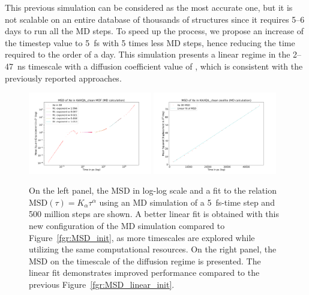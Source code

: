 \documentclass[main]{subfiles}
\begin{document}
This previous simulation can be considered as the most accurate one, but it is not scalable on an entire database of thousands of structures since it requires 5--6 days to run all the MD steps. To speed up the process, we propose an increase of the timestep value to 5~\si{\fs} with 5 times less MD steps, hence reducing the time required to the order of a day. This simulation presents a linear regime in the {2}--{47}~\si{\ns} timescale with a diffusion coefficient value of , which is consistent with the previously reported approaches. 

\begin{figure}[ht]
  \centering
  \includegraphics[width=0.48\textwidth]{figures/5-diffusion/MSD_Xe_KAXQIL_clean_5fs.pdf}
  \includegraphics[width=0.48\textwidth]{figures/5-diffusion/MSD_Xe_coeff_KAXQIL_clean_5fs.pdf}
\caption{ On the left panel, the MSD in log-log scale and a fit to the relation $\text{MSD}(\tau) = K_\alpha\tau^\alpha$ using an MD simulation of a \SI{5}{\fs}-time step and 500 million steps are shown. A better linear fit is obtained with this new configuration of the MD simulation compared to Figure~\ref{fgr:MSD_init}, as more timescales are explored while utilizing the same computational resources. On the right panel, the MSD on the timescale of the diffusion regime is presented. The linear fit demonstrates improved performance compared to the previous Figure~\ref{fgr:MSD_linear_init}.}\label{fgr:MSD_5fs}
\end{figure}
\end{document}
